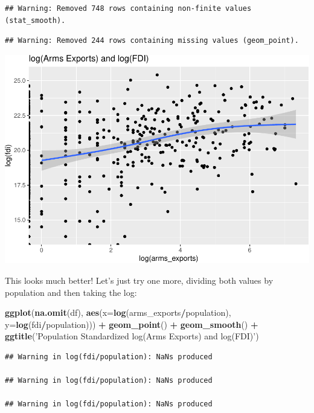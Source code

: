 \documentclass[12pt,]{article}
\newenvironment{Shaded}{\begin{snugshade}}{\end{snugshade}}
\newcommand{\DataTypeTok}[1]{\textcolor[rgb]{0.13,0.29,0.53}{#1}}
\newcommand{\KeywordTok}[1]{\textcolor[rgb]{0.13,0.29,0.53}{\textbf{#1}}}
\newcommand{\NormalTok}[1]{#1}
\newcommand{\OperatorTok}[1]{\textcolor[rgb]{0.81,0.36,0.00}{\textbf{#1}}}
\newcommand{\StringTok}[1]{\textcolor[rgb]{0.31,0.60,0.02}{#1}}
\begin{document}
\begin{verbatim}
## Warning: Removed 748 rows containing non-finite values (stat_smooth).
\end{verbatim}

\begin{verbatim}
## Warning: Removed 244 rows containing missing values (geom_point).
\end{verbatim}

\includegraphics{proposal_files/figure-latex/unnamed-chunk-20-1.pdf}

This looks much better! Let's just try one more, dividing both values by
population and then taking the log:

\begin{Shaded}
\begin{Highlighting}[]
\KeywordTok{ggplot}\NormalTok{(}\KeywordTok{na.omit}\NormalTok{(df), }\KeywordTok{aes}\NormalTok{(}\DataTypeTok{x=}\KeywordTok{log}\NormalTok{(arms_exports}\OperatorTok{/}\NormalTok{population), }\DataTypeTok{y=}\KeywordTok{log}\NormalTok{(fdi}\OperatorTok{/}\NormalTok{population))) }\OperatorTok{+}\StringTok{ }
\StringTok{    }\KeywordTok{geom_point}\NormalTok{() }\OperatorTok{+}
\StringTok{    }\KeywordTok{geom_smooth}\NormalTok{() }\OperatorTok{+}
\StringTok{    }\KeywordTok{ggtitle}\NormalTok{(}\StringTok{'Population Standardized log(Arms Exports) and log(FDI)'}\NormalTok{)}
\end{Highlighting}
\end{Shaded}

\begin{verbatim}
## Warning in log(fdi/population): NaNs produced

## Warning in log(fdi/population): NaNs produced

## Warning in log(fdi/population): NaNs produced
\end{verbatim}
\end{document}
